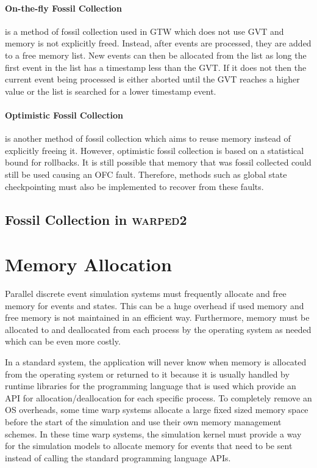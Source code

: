\documentclass[11pt]{book}
\begin{document}
\paragraph{On-the-fly Fossil Collection} is a method of fossil collection used in GTW
which does not use GVT and memory is not explicitly freed. Instead, after events are
processed, they are added to a free memory list. New events can then be allocated from the
list as long the first event in the list has a timestamp less than the GVT. If it does not
then the current event being processed is either aborted until the GVT reaches a higher
value or the list is searched for a lower timestamp event.

\paragraph{Optimistic Fossil Collection} is another method of fossil collection which
aims to reuse memory instead of explicitly freeing it. However, optimistic fossil collection
is based on a statistical bound for rollbacks. It is still possible that memory that was
fossil collected could still be used causing an OFC fault. Therefore, methods such as
global state checkpointing must also be implemented to recover from these faults.

\subsection{Fossil Collection in \textsc{warped2}}



\section{Memory Allocation}

Parallel discrete event simulation systems must frequently allocate and free memory for
events and states. This can be a huge overhead if used memory and free memory is not
maintained in an efficient way. Furthermore, memory must be allocated to and deallocated from
each process by the operating system as needed which can be even more costly.

In a standard system, the application will never know when memory is allocated from the operating
system or returned to it because it is usually handled by runtime libraries for the programming
language that is used which provide an API for allocation/deallocation for each specific
process. To completely remove an OS overheads, some time warp systems allocate a large fixed
sized memory space before the start of the simulation and use their own memory management
schemes. In these time warp systems, the simulation kernel must provide a way for the simulation
models to allocate memory for events that need to be sent instead of calling the standard programming
language APIs.
\end{document}
